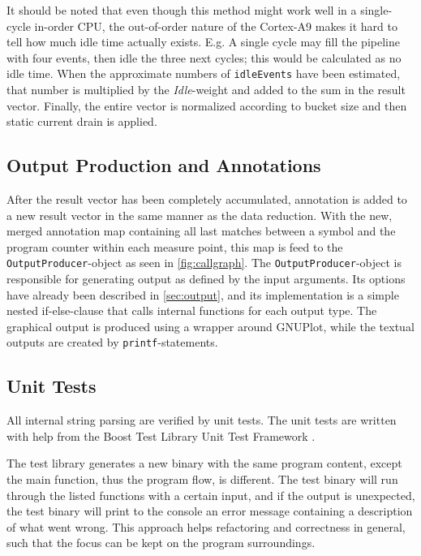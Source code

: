 It should be noted that even though this method might work well in a
single-cycle in-order CPU, the out-of-order nature of the Cortex-A9 makes it
hard to tell how much idle time actually exists. E.g. A single cycle may fill
the pipeline with four events, then idle the three next cycles; this would be
calculated as no idle time. When the approximate numbers of \texttt{idleEvents} have been
estimated, that number is multiplied by the \emph{Idle}-weight and added to the
sum in the result vector. Finally, the entire vector is normalized according to
bucket size and then static current drain is applied.


\subsection{Output Production and Annotations}

After the result vector has been completely accumulated, annotation
is added to a new result vector in the same manner as the data reduction.
With the new, merged annotation map containing all last matches between
a symbol and the program counter within each measure point, this map
is feed to the \texttt{OutputProducer}-object as seen in \autoref{fig:callgraph}.
The \texttt{OutputProducer}-object is responsible for generating output as defined
by the input arguments. Its options have already been described in \autoref{sec:output},
and its implementation is a simple nested if-else-clause that calls internal functions for
each output type. The graphical output is produced using a wrapper around GNUPlot, while
the textual outputs are created by \texttt{printf}-statements.


\subsection{Unit Tests}

All internal string parsing are verified by unit tests. The unit tests
are written with help from the Boost Test Library Unit Test Framework \cite{boostunittest}.

The test library generates a new binary with the same program content, except the
main function, thus the program flow, is different. The test binary will
run through the listed functions with a certain input, and if the output is unexpected,
the test binary will print to the console an error message containing a description of what
went wrong. This approach helps refactoring and correctness in general, such that
the focus can be kept on the program surroundings.

